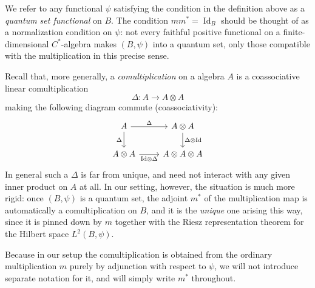 \begin{remark}
    \label{rem:quantum-set-functional}
    We refer to any functional \( \psi \) satisfying the condition in the
    definition above as a \emph{quantum set functional} on \( B \). The
    condition \( mm^{*} = \operatorname{Id}_B \) should be thought of as a
    normalization condition on \( \psi \): not every faithful positive
    functional on a finite-dimensional \( C^{*} \)-algebra makes
    \( (B,\psi) \) into a quantum set, only those compatible with the
    multiplication in this precise sense.
\end{remark}

\begin{remark}
    \label{rem:comultiplication-general}
    Recall that, more generally, a \emph{comultiplication} on a
    algebra \( A \) is a coassociative linear comultiplication
    \[
        \Delta \colon A \rightarrow A \otimes A
    \]
    making the following diagram commute (coassociativity):
    \[
        \begin{tikzcd}
            A \arrow[r,"\Delta"] \arrow[d,"\Delta"']
            & A\otimes A \arrow[d,"{\Delta\otimes\mathrm{Id}}"] \\
            A\otimes A \arrow[r,"{\mathrm{Id}\otimes\Delta}"']
            & A\otimes A\otimes A
        \end{tikzcd}
    \]
    In general such a \( \Delta \) is far from unique, and need not
    interact with any given inner product on \( A \) at all. In our
    setting, however, the situation is much more rigid: once
    \( (B,\psi) \) is a quantum set, the adjoint \( m^{*} \) of the
    multiplication map is automatically a comultiplication on \( B \),
    and it is the \emph{unique} one arising this way, since it is pinned
    down by \( m \) together with the Riesz representation theorem for
    the Hilbert space \( L^2(B,\psi) \).
\end{remark}

\begin{remark}
    \label{rem:m-star-notation}
    Because in our setup the comultiplication is obtained from the
    ordinary multiplication \( m \) purely by adjunction with respect to
    \( \psi \), we will not introduce separate notation for it, and will
    simply write \( m^{*} \) throughout.
\end{remark}

